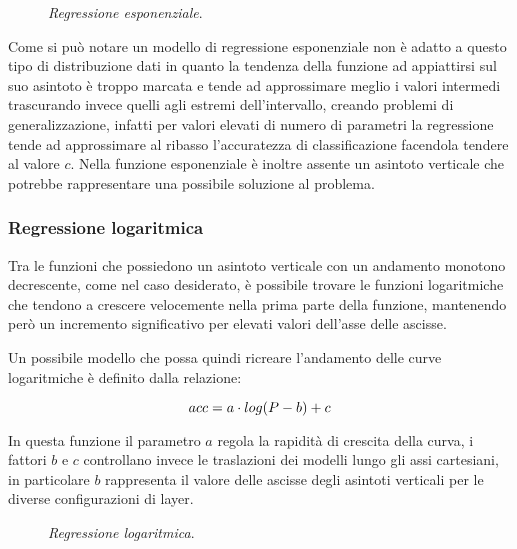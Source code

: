 \begin{figure}[ht]
    \centering
    \quad
    \quad
    \caption{\textit{Regressione esponenziale}.}
    \label{fig:exp_reg}
\end{figure}

Come si può notare un modello di regressione esponenziale non è adatto a questo tipo di distribuzione dati in quanto la tendenza della funzione ad appiattirsi sul suo asintoto è troppo marcata e tende ad approssimare meglio i valori intermedi trascurando invece quelli agli estremi dell'intervallo, creando problemi di generalizzazione, infatti per valori elevati di numero di parametri la regressione tende ad approssimare al ribasso l'accuratezza di classificazione facendola tendere al valore $c$. Nella funzione esponenziale è inoltre assente un asintoto verticale che potrebbe rappresentare una possibile soluzione al problema. 

\subsubsection{Regressione logaritmica}

Tra le funzioni che possiedono un asintoto verticale con un andamento monotono decrescente, come nel caso desiderato, è possibile trovare le funzioni logaritmiche che tendono a crescere velocemente nella prima parte della funzione, mantenendo però un incremento significativo per elevati valori dell'asse delle ascisse.

Un possibile modello che possa quindi ricreare l'andamento delle curve logaritmiche è definito dalla relazione:

\begin{equation}
    \centering
    acc = a \cdot log(P - b) + c
\end{equation}

In questa funzione il parametro $a$ regola la rapidità di crescita della curva, i fattori $b$ e $c$ controllano invece le traslazioni dei modelli lungo gli assi cartesiani, in particolare $b$ rappresenta il valore delle ascisse degli asintoti verticali per le diverse configurazioni di layer.

\begin{figure}[ht]
    \centering
    \quad
    \quad
    \caption{\textit{Regressione logaritmica}.}
    \label{fig:log_reg}
\end{figure}

